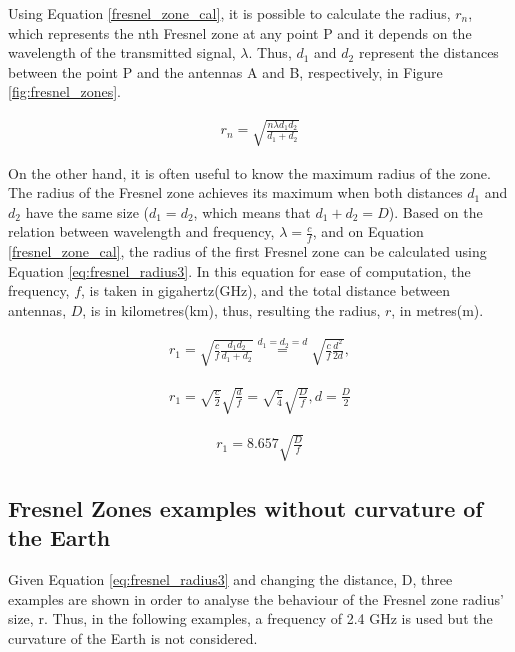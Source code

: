 Using Equation \ref{fresnel_zone_cal}, it is possible to calculate the radius, $r_n$, which represents the nth Fresnel zone at any point P and it depends on the wavelength of the transmitted signal, $\lambda$. Thus, $d_1$ and $d_2$ represent the distances between the point P and the antennas A and B, respectively, in Figure \ref{fig:fresnel_zones}.

\begin{align}
r_n = \sqrt{\frac{n \lambda d_1 d_2}{d_1+d_2}} \label{fresnel_zone_cal}
\end{align}

On the other hand, it is often useful to know the maximum radius of the zone. The radius of the Fresnel zone achieves its maximum when both distances $d_1$ and $d_2$ have the same size ($d_1=d_2$, which means that $d_1+d_2=D$). Based on the relation between wavelength and frequency, $\lambda = \frac{c}{f}$, and on Equation \ref{fresnel_zone_cal}, the radius of the first Fresnel zone can be calculated using Equation \ref{eq:fresnel_radius3}. In this equation for ease of computation, the frequency, $f$, is taken in gigahertz(GHz), and the total distance between antennas, $D$, is in kilometres(km), thus, resulting the radius, $r$, in metres(m). 

\begin{align}
r_1 = \sqrt{\frac{c}{f}\frac{d_1 d_2}{d_1+d_2}} \stackrel{d_1=d_2=d}{=} \sqrt{\frac{c}{f}\frac{d^2}{2d}},  \label{eq:fresnel_radius1}
\end{align}

\begin{align}
r_1 = \sqrt{\frac{c}{2}}\sqrt{\frac{d}{f}} = \sqrt{\frac{c}{4}}\sqrt{\frac{D}{f}}, d=\frac{D}{2} \label{eq:fresnel_radius2}
\end{align}

\begin{align}
r_1 = 8.657 \sqrt{\frac{D}{f}} \label{eq:fresnel_radius3}
\end{align}

\subsection*{Fresnel Zones examples without curvature of the Earth}
Given Equation \ref{eq:fresnel_radius3} and changing the distance, D, three examples are shown in order to analyse the behaviour of the Fresnel zone radius' size, r. Thus, in the following examples, a frequency of 2.4 GHz is used but the curvature of the Earth is not considered. 

